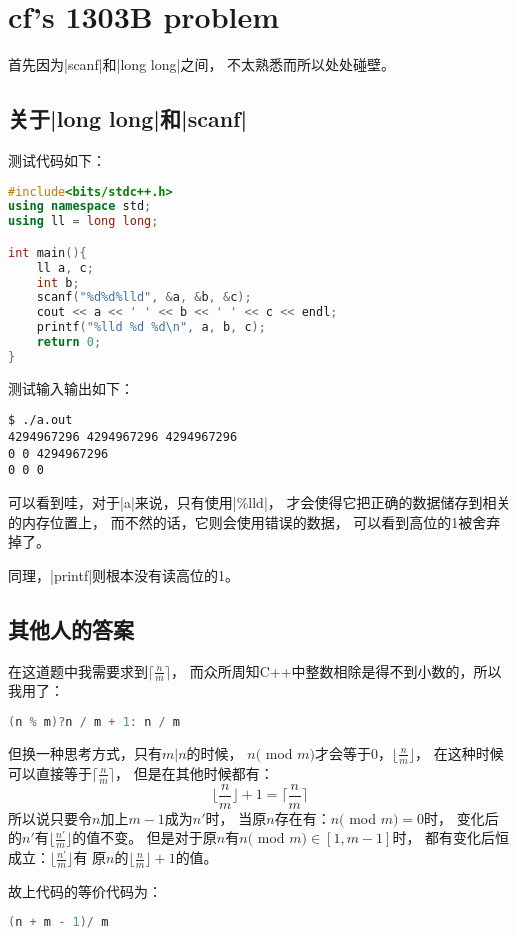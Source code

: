 
\section{cf's 1303B problem}

首先因为\vb|scanf|和\vb|long long|之间，
不太熟悉而所以处处碰壁。

\subsection{关于\vb|long long|和\vb|scanf|}
测试代码如下：
\begin{lstlisting}[language=C++]
#include<bits/stdc++.h>
using namespace std;
using ll = long long;

int main(){
    ll a, c;
    int b;
    scanf("%d%d%lld", &a, &b, &c);
    cout << a << ' ' << b << ' ' << c << endl;
    printf("%lld %d %d\n", a, b, c);
    return 0;
}
\end{lstlisting}

测试输入输出如下：
\begin{lstlisting}[mathescape = false]
$ ./a.out
4294967296 4294967296 4294967296
0 0 4294967296
0 0 0
\end{lstlisting}

可以看到哇，对于\vb|a|来说，只有使用\vb|\%lld|，
才会使得它把正确的数据储存到相关的内存位置上，
而不然的话，它则会使用错误的数据，
可以看到高位的1被舍弃掉了。

同理，\vb|printf|则根本没有读高位的1。

\subsection{其他人的答案}
在这道题中我需要求到$\lceil\frac{n}{m}\rceil$，
而众所周知C++中整数相除是得不到小数的，所以我用了：
\begin{lstlisting}[language=C++]
(n % m)?n / m + 1: n / m
\end{lstlisting}

但换一种思考方式，只有$m|n$的时候，
$n($ mod $m)$才会等于$0$，$\lfloor\frac{n}{m}\rfloor$，
在这种时候可以直接等于$\lceil\frac{n}{m}\rceil$，
但是在其他时候都有：
$$\lfloor\frac{n}{m}\rfloor + 1 = \lceil\frac{n}{m}\rceil$$
所以说只要令$n$加上$m-1$成为$n'$时，
当原$n$存在有：$n($ mod $m) = 0$时，
变化后的$n'$有$\lfloor\frac{n'}{m}\rfloor$的值不变。
但是对于原$n$有$n($ mod $m)\in [1, m-1]$时，
都有变化后恒成立：$\lfloor\frac{n'}{m}\rfloor$有
原$n$的$\lfloor\frac{n}{m}\rfloor + 1$的值。

故上代码的等价代码为：
\begin{lstlisting}[language=C++]
(n + m - 1)/ m
\end{lstlisting}


